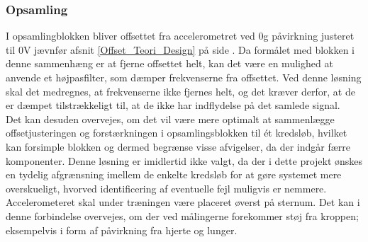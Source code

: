 \subsubsection{Opsamling}
I opsamlingblokken bliver offsettet fra accelerometret ved $0$g påvirkning justeret til $0$V jævnfør afsnit \ref{Offset_Teori_Design} på side \pageref{Offset_Teori_Design}. Da formålet med blokken i denne sammenhæng er at fjerne offsettet helt, kan det være en mulighed at anvende et højpasfilter, som dæmper frekvenserne fra offsettet. Ved denne løsning skal det medregnes, at frekvenserne ikke fjernes helt, og det kræver derfor, at de er dæmpet tilstrækkeligt til, at de ikke har indflydelse på det samlede signal. \\
Det kan desuden overvejes, om det vil være mere optimalt at sammenlægge offsetjusteringen og forstærkningen i opsamlingsblokken til ét kredsløb, hvilket kan forsimple blokken og dermed begrænse visse afvigelser, da der indgår færre komponenter. Denne løsning er imidlertid ikke valgt, da der i dette projekt ønskes en tydelig afgrænsning imellem de enkelte kredsløb for at gøre systemet mere overskueligt, hvorved identificering af eventuelle fejl muligvis er nemmere.\\
Accelerometeret skal under træningen være placeret øverst på sternum. Det kan i denne forbindelse overvejes, om der ved målingerne forekommer støj fra kroppen; eksempelvis i form af påvirkning fra hjerte og lunger. 

